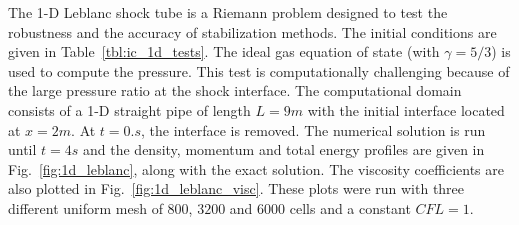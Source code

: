 \documentclass[preprint,10pt]{elsarticle}
\newcommand{\fig}[1]{Fig.~\ref{#1}}                      %
\newcommand{\tbl}[1]{Table~\ref{#1}}                     %
\begin{document}
The 1-D Leblanc shock tube is a Riemann problem designed to test the robustness and the accuracy of stabilization methods. The initial conditions are given in \tbl{tbl:ic_1d_tests}. The ideal gas equation of state (with $\gamma=5/3$) is used to compute the pressure.
This test is computationally challenging because of the large pressure ratio at the shock interface.
The computational domain consists of a 1-D straight pipe of length $L=9m$ with the initial interface located at $x=2m$. At $t=0.s$, the interface is removed. The numerical solution is run until $t=4 s$ and the density, momentum and total energy profiles are given in \fig{fig:1d_leblanc}, along with the exact solution. The viscosity coefficients are also plotted in \fig{fig:1d_leblanc_visc}. These plots were  run with three different uniform mesh of $800$, $3200$ and $6000$ cells and a constant $CFL = 1$.
\end{document}
